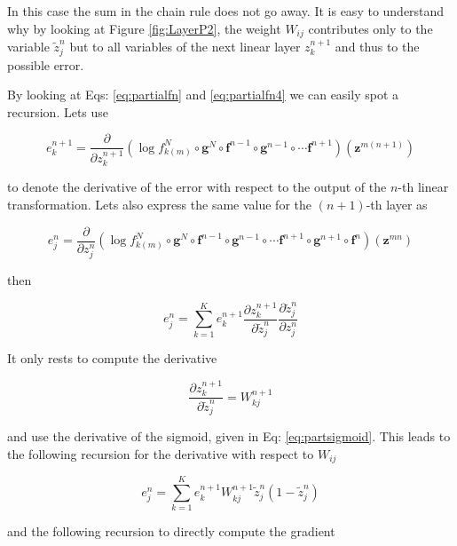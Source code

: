 In this case the sum in the chain rule does not go away. It is easy to understand why by looking at Figure \ref{fig:LayerP2}, the weight $W_{ij}$ contributes only to the variable $\tilde{z}^n_j$ but to all variables of the next linear layer $z^{n+1}_k$ and thus to the possible error. 

By looking at Eqs: \ref{eq:partialfn} and \ref{eq:partialfn4} we can easily spot a recursion. Lets use

\begin{equation}
e^{n+1}_k = \frac{\partial}{\partial z^{n+1}_{k}} (\log f_{k(m)}^N \circ \mathbf{g}^N \circ \mathbf{f}^{n-1} \circ \mathbf{g}^{n-1} \circ \cdots \mathbf{f}^{n+1})(\mathbf{z}^{m(n+1)})
\end{equation}

\noindent to denote the derivative of the error with respect to the output of the $n$-th linear transformation. Lets also express the same value for the $(n+1)$-th layer as   

\begin{equation}
e^{n}_j = \frac{\partial}{\partial z^{n}_{j}} (\log f_{k(m)}^N \circ \mathbf{g}^N \circ \mathbf{f}^{n-1} \circ \mathbf{g}^{n-1} \circ \cdots \mathbf{f}^{n+1} \circ \mathbf{g}^{n+1} \circ \mathbf{f}^{n})(\mathbf{z}^{mn}) 
\end{equation}

\noindent then

\begin{equation}
e^{n}_j = \sum_{k=1}^K e^{n+1}_k \frac{\partial z^{n+1}_k}{\partial \tilde{z}_{j}^n}\frac{\partial \tilde{z}^n_{j}}{\partial z_{j}^n} 
\end{equation}

\noindent It only rests to compute the derivative

\begin{equation}
\frac{\partial z^{n+1}_k}{\partial \tilde{z}_{j}^n} = W_{kj}^{n+1} 
\end{equation}

\noindent and use the derivative of the sigmoid, given in Eq: \ref{eq:partsigmoid}. This leads to the following recursion for the derivative with respect to $W_{ij}$

\begin{equation}
e^{n}_j = \sum_{k=1}^K e^{n+1}_k W_{kj}^{n+1}\tilde{z}^n_{j}(1-\tilde{z}^n_{j})
\end{equation}

\noindent and the following recursion to directly compute the gradient

